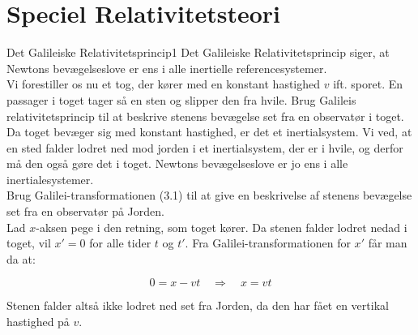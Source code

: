 \documentclass[crop=false, class=memoir]{standalone}
\begin{document}
\chapter{Speciel Relativitetsteori} \label{chap:rel_facit}




\begin{opgave}{Det Galileiske Relativitetsprincip}{1}
	Det Galileiske Relativitetsprincip siger, at Newtons bevægelseslove er ens i alle inertielle referencesystemer.\\
	Vi forestiller os nu et tog, der kører med en konstant hastighed $v$ ift. sporet. En passager i toget tager så en sten og slipper den fra hvile.  
	\opg Brug Galileis relativitetsprincip til at beskrive stenens bevægelse set fra en observatør i toget.\\
	
	Da toget bevæger sig med konstant hastighed, er det et inertialsystem. Vi ved, at en sted falder lodret ned mod jorden i et inertialsystem, der er i hvile, og derfor må den også gøre det i toget. Newtons bevægelseslove er jo ens i alle inertialesystemer.\\  
	\opg Brug Galilei-transformationen (3.1) til at give en beskrivelse af stenens bevægelse set fra en observatør på Jorden.\\
	
	Lad $x$-aksen pege i den retning, som toget kører. Da stenen falder lodret nedad i toget, vil $x'=0$ for alle tider $t$ og $t'$. Fra Galilei-transformationen for $x'$ får man da at:
	
	$$0 = x-vt \quad \Rightarrow \quad x = vt$$
	
	Stenen falder altså ikke lodret ned set fra Jorden, da den har fået en vertikal hastighed på $v$. 
\end{opgave}
\end{document}

